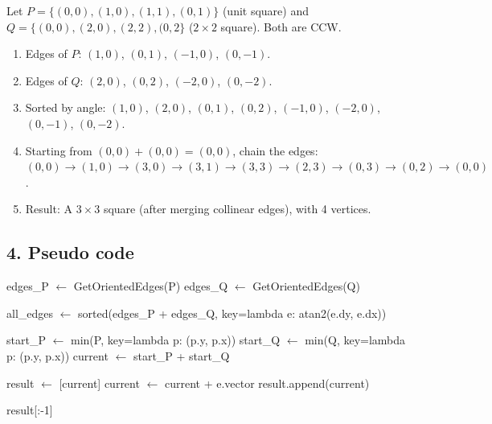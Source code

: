 \begin{example}
\label{ex:ms_squares}
Let $P = \{(0,0),(1,0),(1,1),(0,1)\}$ (unit square) and $Q = \{(0,0),(2,0),(2,2),(0,2\}$ ($2 \times 2$ square). Both are CCW.
\begin{enumerate}
    \item Edges of $P$: $(1,0)$, $(0,1)$, $(-1,0)$, $(0,-1)$.
    \item Edges of $Q$: $(2,0)$, $(0,2)$, $(-2,0)$, $(0,-2)$.
    \item Sorted by angle: $(1,0)$, $(2,0)$, $(0,1)$, $(0,2)$, $(-1,0)$, $(-2,0)$, $(0,-1)$, $(0,-2)$.
    \item Starting from $(0,0)+(0,0) = (0,0)$, chain the edges: $(0,0) \to (1,0) \to (3,0) \to (3,1) \to (3,3) \to (2,3) \to (0,3) \to (0,2) \to (0,0)$.
    \item Result: A $3 \times 3$ square (after merging collinear edges), with 4 vertices.
\end{enumerate}
\end{example}



\subsection{4. Pseudo code}
\begin{algorithm}
\begin{algorithmic}[1]
\label{alg:ms_convex}
    \State edges\_P $\gets$ GetOrientedEdges(P)
    \State edges\_Q $\gets$ GetOrientedEdges(Q)
    
    \State all\_edges $\gets$ sorted(edges\_P + edges\_Q, key=lambda e: atan2(e.dy, e.dx))
    
    \State start\_P $\gets$ min(P, key=lambda p: (p.y, p.x))
    \State start\_Q $\gets$ min(Q, key=lambda p: (p.y, p.x))
    \State current $\gets$ start\_P + start\_Q
    
    \State result $\gets$ [current]
        \State current $\gets$ current + e.vector
        \State result.append(current)
    \EndFor
        
    \State \Return result[:-1] 
\EndFunction
\end{algorithmic}
\end{algorithm}

